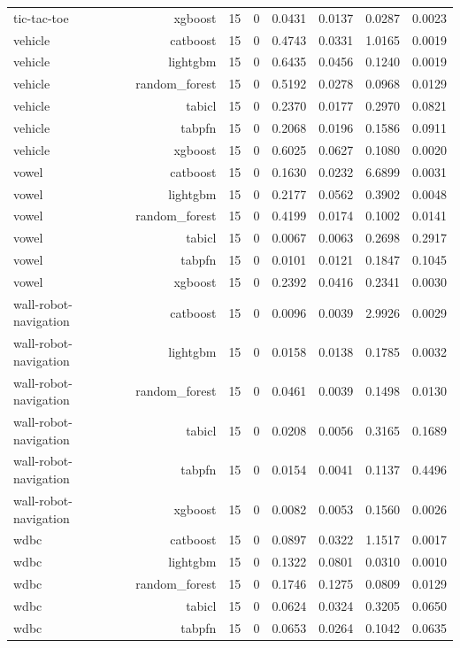 \begin{table}[htbp]
\begin{tabular}{lrrrrrrr}
tic-tac-toe & xgboost & 15 & 0 & 0.0431 & 0.0137 & 0.0287 & 0.0023 \\
vehicle & catboost & 15 & 0 & 0.4743 & 0.0331 & 1.0165 & 0.0019 \\
vehicle & lightgbm & 15 & 0 & 0.6435 & 0.0456 & 0.1240 & 0.0019 \\
vehicle & random\_forest & 15 & 0 & 0.5192 & 0.0278 & 0.0968 & 0.0129 \\
vehicle & tabicl & 15 & 0 & 0.2370 & 0.0177 & 0.2970 & 0.0821 \\
vehicle & tabpfn & 15 & 0 & 0.2068 & 0.0196 & 0.1586 & 0.0911 \\
vehicle & xgboost & 15 & 0 & 0.6025 & 0.0627 & 0.1080 & 0.0020 \\
vowel & catboost & 15 & 0 & 0.1630 & 0.0232 & 6.6899 & 0.0031 \\
vowel & lightgbm & 15 & 0 & 0.2177 & 0.0562 & 0.3902 & 0.0048 \\
vowel & random\_forest & 15 & 0 & 0.4199 & 0.0174 & 0.1002 & 0.0141 \\
vowel & tabicl & 15 & 0 & 0.0067 & 0.0063 & 0.2698 & 0.2917 \\
vowel & tabpfn & 15 & 0 & 0.0101 & 0.0121 & 0.1847 & 0.1045 \\
vowel & xgboost & 15 & 0 & 0.2392 & 0.0416 & 0.2341 & 0.0030 \\
wall-robot-navigation & catboost & 15 & 0 & 0.0096 & 0.0039 & 2.9926 & 0.0029 \\
wall-robot-navigation & lightgbm & 15 & 0 & 0.0158 & 0.0138 & 0.1785 & 0.0032 \\
wall-robot-navigation & random\_forest & 15 & 0 & 0.0461 & 0.0039 & 0.1498 & 0.0130 \\
wall-robot-navigation & tabicl & 15 & 0 & 0.0208 & 0.0056 & 0.3165 & 0.1689 \\
wall-robot-navigation & tabpfn & 15 & 0 & 0.0154 & 0.0041 & 0.1137 & 0.4496 \\
wall-robot-navigation & xgboost & 15 & 0 & 0.0082 & 0.0053 & 0.1560 & 0.0026 \\
wdbc & catboost & 15 & 0 & 0.0897 & 0.0322 & 1.1517 & 0.0017 \\
wdbc & lightgbm & 15 & 0 & 0.1322 & 0.0801 & 0.0310 & 0.0010 \\
wdbc & random\_forest & 15 & 0 & 0.1746 & 0.1275 & 0.0809 & 0.0129 \\
wdbc & tabicl & 15 & 0 & 0.0624 & 0.0324 & 0.3205 & 0.0650 \\
wdbc & tabpfn & 15 & 0 & 0.0653 & 0.0264 & 0.1042 & 0.0635 \\

\end{tabular}
\end{table}

